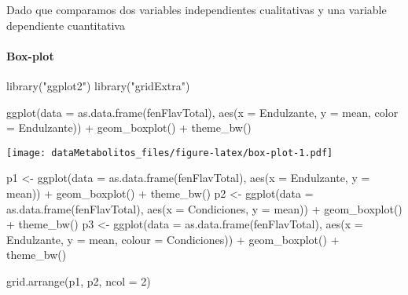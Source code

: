 \documentclass[
]{article}
\newenvironment{Shaded}{\begin{snugshade}}{\end{snugshade}}
\newcommand{\AttributeTok}[1]{\textcolor[rgb]{0.77,0.63,0.00}{#1}}
\newcommand{\DecValTok}[1]{\textcolor[rgb]{0.00,0.00,0.81}{#1}}
\newcommand{\FunctionTok}[1]{\textcolor[rgb]{0.00,0.00,0.00}{#1}}
\newcommand{\NormalTok}[1]{#1}
\newcommand{\OtherTok}[1]{\textcolor[rgb]{0.56,0.35,0.01}{#1}}
\newcommand{\SpecialCharTok}[1]{\textcolor[rgb]{0.00,0.00,0.00}{#1}}
\newcommand{\StringTok}[1]{\textcolor[rgb]{0.31,0.60,0.02}{#1}}
\begin{document}
Dado que comparamos dos variables independientes cualitativas y una
variable dependiente cuantitativa

\hypertarget{box-plot}{%
\paragraph{Box-plot}\label{box-plot}}

\begin{Shaded}
\begin{Highlighting}[]
\FunctionTok{library}\NormalTok{(}\StringTok{"ggplot2"}\NormalTok{)}
\FunctionTok{library}\NormalTok{(}\StringTok{"gridExtra"}\NormalTok{)}

\FunctionTok{ggplot}\NormalTok{(}\AttributeTok{data =} \FunctionTok{as.data.frame}\NormalTok{(fenFlavTotal), }\FunctionTok{aes}\NormalTok{(}\AttributeTok{x =}\NormalTok{ Endulzante, }\AttributeTok{y =}\NormalTok{ mean, }\AttributeTok{color =}\NormalTok{ Endulzante)) }\SpecialCharTok{+}
  \FunctionTok{geom\_boxplot}\NormalTok{() }\SpecialCharTok{+}
  \FunctionTok{theme\_bw}\NormalTok{()}
\end{Highlighting}
\end{Shaded}

\texttt{[image: dataMetabolitos\_files/figure-latex/box-plot-1.pdf]}

\begin{Shaded}
\begin{Highlighting}[]
\NormalTok{p1 }\OtherTok{\textless{}{-}} \FunctionTok{ggplot}\NormalTok{(}\AttributeTok{data =} \FunctionTok{as.data.frame}\NormalTok{(fenFlavTotal), }\FunctionTok{aes}\NormalTok{(}\AttributeTok{x =}\NormalTok{ Endulzante, }\AttributeTok{y =}\NormalTok{ mean)) }\SpecialCharTok{+} 
  \FunctionTok{geom\_boxplot}\NormalTok{() }\SpecialCharTok{+} \FunctionTok{theme\_bw}\NormalTok{()}
\NormalTok{p2 }\OtherTok{\textless{}{-}} \FunctionTok{ggplot}\NormalTok{(}\AttributeTok{data =} \FunctionTok{as.data.frame}\NormalTok{(fenFlavTotal), }\FunctionTok{aes}\NormalTok{(}\AttributeTok{x =}\NormalTok{ Condiciones, }\AttributeTok{y =}\NormalTok{ mean)) }\SpecialCharTok{+}
  \FunctionTok{geom\_boxplot}\NormalTok{() }\SpecialCharTok{+} \FunctionTok{theme\_bw}\NormalTok{()}
\NormalTok{p3 }\OtherTok{\textless{}{-}} \FunctionTok{ggplot}\NormalTok{(}\AttributeTok{data =} \FunctionTok{as.data.frame}\NormalTok{(fenFlavTotal), }\FunctionTok{aes}\NormalTok{(}\AttributeTok{x =}\NormalTok{ Endulzante, }\AttributeTok{y =}\NormalTok{ mean, }\AttributeTok{colour =}\NormalTok{ Condiciones)) }\SpecialCharTok{+}
  \FunctionTok{geom\_boxplot}\NormalTok{() }\SpecialCharTok{+} \FunctionTok{theme\_bw}\NormalTok{()}

\FunctionTok{grid.arrange}\NormalTok{(p1, p2, }\AttributeTok{ncol =} \DecValTok{2}\NormalTok{)}
\end{Highlighting}
\end{Shaded}
\end{document}
